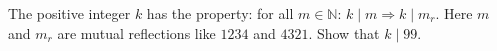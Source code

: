 The positive integer $k$ has the property: for all $m \in \mathbb{N}$: $k \mid m \Rightarrow k \mid m_r$. Here $m$ and $m_r$ are mutual reflections like $1234$ and $4321$. Show that $k \mid 99$.
